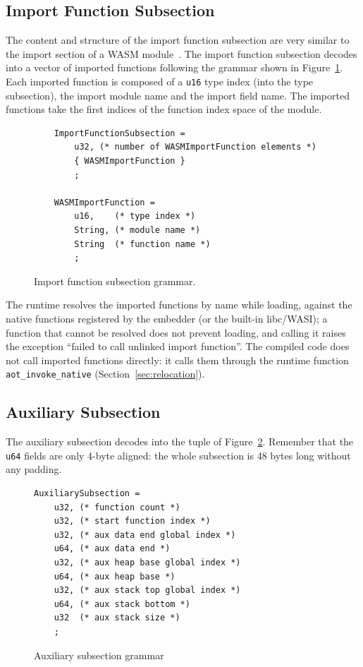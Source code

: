 \documentclass{article}
\begin{document}
\subsection{Import Function Subsection}
The content and structure of the import function subsection are very similar to the import section of a WASM module~\cite[Sec.~5.5.5]{webassembly2019core}.
The import function subsection decodes into a vector of imported functions following the grammar shown in Figure~\ref{fig:import-function-subsection-grammar}.
Each imported function is composed of a \verb|u16| type index (into the type subsection), the import module name and the import field name.
The imported functions take the first indices of the function index space of the module.

\begin{figure}[H]
\begin{verbatim}
    ImportFunctionSubsection =
        u32, (* number of WASMImportFunction elements *)
        { WASMImportFunction }
        ;

    WASMImportFunction =
        u16,    (* type index *)
        String, (* module name *)
        String  (* function name *)
        ;
\end{verbatim}
\caption{Import function subsection grammar.}
\label{fig:import-function-subsection-grammar}
\end{figure}

The runtime resolves the imported functions by name while loading, against the native functions registered by the embedder (or the built-in libc/WASI); a function that cannot be resolved does not prevent loading, and calling it raises the exception ``failed to call unlinked import function''.
The compiled code does not call imported functions directly: it calls them through the runtime function \verb|aot_invoke_native| (Section~\ref{sec:relocation}).

\subsection{Auxiliary Subsection}
\label{section:init-data-auxiliary}

The auxiliary subsection decodes into the tuple of Figure~\ref{fig:auxiliary-subsection-grammar}.
Remember that the \verb|u64| fields are only 4-byte aligned: the whole subsection is 48 bytes long without any padding.

\begin{figure}[H]
\begin{verbatim}
AuxiliarySubsection =
    u32, (* function count *)
    u32, (* start function index *)
    u32, (* aux data end global index *)
    u64, (* aux data end *)
    u32, (* aux heap base global index *)
    u64, (* aux heap base *)
    u32, (* aux stack top global index *)
    u64, (* aux stack bottom *)
    u32  (* aux stack size *)
    ;
\end{verbatim}
\caption{Auxiliary subsection grammar}
\label{fig:auxiliary-subsection-grammar}
\end{figure}
\end{document}
